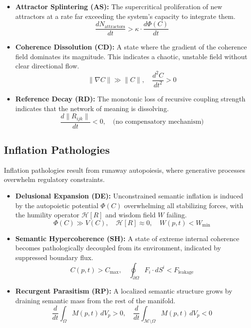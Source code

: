 \begin{itemize}
    \item \textbf{Attractor Splintering (AS):} The supercritical proliferation of new attractors at a rate far exceeding the system's capacity to integrate them.
    \begin{equation}
    \frac{dN_{\text{attractors}}}{dt} > \kappa \cdot \frac{d\Phi(C)}{dt}
    \end{equation}

    \item \textbf{Coherence Dissolution (CD):} A state where the gradient of the coherence field dominates its magnitude. This indicates a chaotic, unstable field without clear directional flow.
    \begin{equation}
    \|\nabla C\| \gg \|C\|, \quad \frac{d^2C}{dt^2} > 0
    \end{equation}

    \item \textbf{Reference Decay (RD):} The monotonic loss of recursive coupling strength indicates that the network of meaning is dissolving.
    \begin{equation}
    \frac{d\|R_{ijk}\|}{dt} < 0, \quad \text{(no compensatory mechanism)}
    \end{equation}
\end{itemize}

\subsection{Inflation Pathologies}

Inflation pathologies result from runaway autopoiesis, where generative processes overwhelm regulatory constraints.

\begin{itemize}
    \item \textbf{Delusional Expansion (DE):} Unconstrained semantic inflation is induced by the autopoietic potential \(\Phi(C)\) overwhelming all stabilizing forces, with the humility operator \(\mathcal{H}[R]\) and wisdom field \(W\) failing.
    \begin{equation}
    \Phi(C) \gg V(C), \quad \mathcal{H}[R] \approx 0, \quad W(p,t) < W_{\text{min}}
    \end{equation}

    \item \textbf{Semantic Hypercoherence (SH):} A state of extreme internal coherence becomes pathologically decoupled from its environment, indicated by suppressed boundary flux.
    \begin{equation}
    C(p,t) > C_{\text{max}}, \quad \oint_{\partial \Omega} F_i \cdot dS^i < F_{\text{leakage}}
    \end{equation}

    \item \textbf{Recurgent Parasitism (RP):} A localized semantic structure grows by draining semantic mass from the rest of the manifold.
    \begin{equation}
    \frac{d}{dt}\int_{\Omega} M(p,t) \, dV_p > 0, \quad \frac{d}{dt}\int_{\mathcal{M}\setminus\Omega} M(p,t) \, dV_p < 0
    \end{equation}
\end{itemize}

